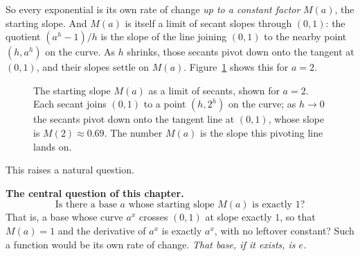 So every exponential is its own rate of change \emph{up to a constant factor} $M(a)$, the starting slope. And $M(a)$ is itself a limit of secant slopes through $(0,1)$: the quotient $(a^h-1)/h$ is the slope of the line joining $(0,1)$ to the nearby point $(h,a^h)$ on the curve. As $h$ shrinks, those secants pivot down onto the tangent at $(0,1)$, and their slopes settle on $M(a)$. Figure~\ref{ch03:fig-secant} shows this for $a=2$.

\begin{figure}[htbp]
\centering
{}
\caption{The starting slope $M(a)$ as a limit of secants, shown for $a=2$. Each secant joins $(0,1)$ to a point $(h,2^h)$ on the curve; as $h\to 0$ the secants pivot down onto the tangent line at $(0,1)$, whose slope is $M(2)\approx 0.69$. The number $M(a)$ is the slope this pivoting line lands on.}
\label{ch03:fig-secant}
\end{figure}

This raises a natural question.

\begin{focusbox}
\textbf{The central question of this chapter.}
\[
\text{Is there a base } a \text{ whose starting slope } M(a) \text{ is exactly } 1?
\]
That is, a base whose curve $a^x$ crosses $(0,1)$ at slope exactly $1$, so that $M(a)=1$ and the derivative of $a^x$ is exactly $a^x$, with no leftover constant? Such a function would be its own rate of change. \emph{That base, if it exists, is $e$.}
\end{focusbox}

